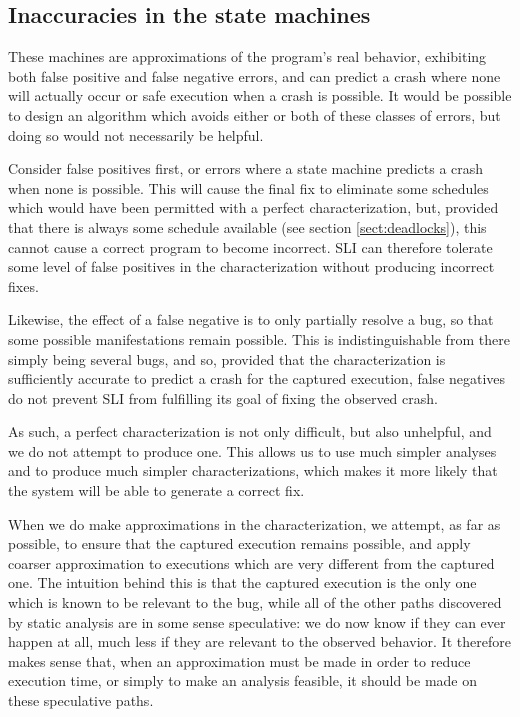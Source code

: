 \documentclass[10pt,twocolumn,preprint,natbib,authoryear]{sigplanconf}
\begin{document}
\subsection{Inaccuracies in the state machines}
\label{sect:inaccuracies}

These machines are approximations of the program's real behavior,
exhibiting both false positive and false negative errors, and can
predict a crash where none will actually occur or safe execution when
a crash is possible.  It would be possible to design an algorithm
which avoids either or both of these classes of errors, but doing so
would not necessarily be helpful.

Consider false positives first, or errors where a state machine
predicts a crash when none is possible.  This will cause the final fix
to eliminate some schedules which would have been permitted with a
perfect characterization, but, provided that there is always some
schedule available (see section \ref{sect:deadlocks}), this cannot
cause a correct program to become incorrect.  SLI can therefore
tolerate some level of false positives in the characterization without
producing incorrect fixes.

Likewise, the effect of a false negative is to only partially resolve
a bug, so that some possible manifestations remain possible.  This is
indistinguishable from there simply being several bugs, and so,
provided that the characterization is sufficiently accurate to predict
a crash for the captured execution, false negatives do not prevent SLI
from fulfilling its goal of fixing the observed crash.

As such, a perfect characterization is not only difficult, but also
unhelpful, and we do not attempt to produce one.  This allows us to
use much simpler analyses and to produce much simpler
characterizations, which makes it more likely that the system will be
able to generate a correct fix.

When we do make approximations in the characterization, we attempt, as
far as possible, to ensure that the captured execution remains
possible, and apply coarser approximation to executions which are very
different from the captured one.  The intuition behind this is that
the captured execution is the only one which is known to be relevant
to the bug, while all of the other paths discovered by static analysis
are in some sense speculative: we do now know if they can ever happen
at all, much less if they are relevant to the observed behavior.  It
therefore makes sense that, when an approximation must be made in
order to reduce execution time, or simply to make an analysis
feasible, it should be made on these speculative paths.
\end{document}
